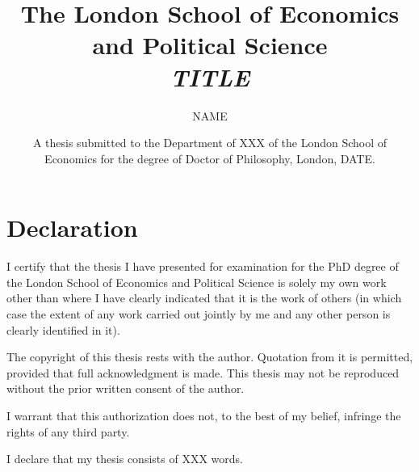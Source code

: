 \documentclass[12pt]{article}
\begin{document}
 
 



\title{{\textbf{\Large{The London School of Economics and Political Science}}\\ 
\bigskip\bigskip\bigskip\bigskip\bigskip\bigskip\bigskip\bigskip\bigskip\bigskip\bigskip  \emph{TITLE \bigskip\bigskip\bigskip\bigskip\bigskip\bigskip\bigskip\bigskip\bigskip\bigskip\bigskip\bigskip}}}




\author{\Large{NAME \bigskip\bigskip\bigskip\bigskip\bigskip\bigskip\bigskip\bigskip\bigskip\bigskip\bigskip\bigskip\bigskip\bigskip}}



\date{\normalsize{A thesis submitted to the Department of XXX of the London School of Economics for the degree of Doctor of Philosophy, London, DATE.}}







\maketitle
\thispagestyle{empty}


\newpage \doublespacing


\section*{\textbf{\bigskip\bigskip\bigskip\bigskip\bigskip \Large{Declaration}}}

I certify that the thesis I have presented for examination for the PhD degree of the London School of Economics and Political Science is solely my own work other than where I have clearly indicated that it is the work of others (in which case the extent of any work carried out jointly by me and any other person is clearly identified in it).

The copyright of this thesis rests with the author. Quotation from it is permitted, provided that full acknowledgment is made. This thesis may not be reproduced without the prior written consent of the author.

I warrant that this authorization does not, to the best of my belief, infringe the rights of any third party.

I declare that my thesis consists of XXX words.

\bigskip
\bigskip
\bigskip
\bigskip
\bigskip
\bigskip
\bigskip
\bigskip
\bigskip
\end{document}
